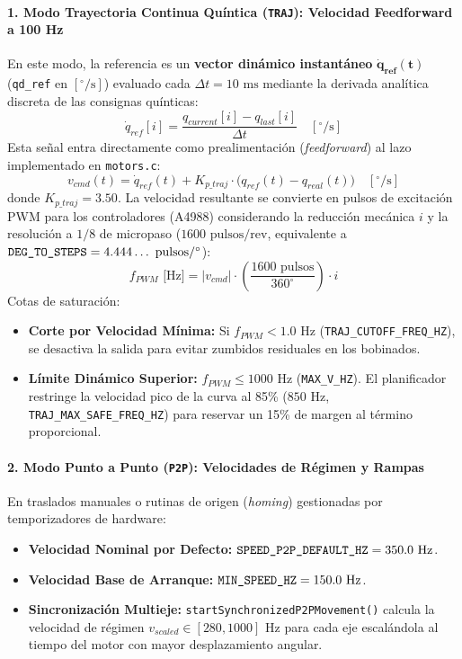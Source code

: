 \documentclass[12pt, a4paper]{report}
\begin{document}
\paragraph{1. Modo Trayectoria Continua Quíntica (\texttt{TRAJ}): Velocidad Feedforward a 100 Hz}
En este modo, la referencia es un \textbf{vector dinámico instantáneo} $\mathbf{\dot{q}_{ref}(t)}$ (\texttt{qd\_ref} en $[^\circ/\text{s}]$) evaluado cada $\Delta t = 10\text{ ms}$ mediante la derivada analítica discreta de las consignas quínticas:
\begin{equation}
    \dot{q}_{ref}[i] = \frac{q_{current}[i] - q_{last}[i]}{\Delta t} \quad [^\circ/\text{s}]
\end{equation}
Esta señal entra directamente como prealimentación (\textit{feedforward}) al lazo implementado en \texttt{motors.c}:
\begin{equation}
    v_{cmd}(t) = \dot{q}_{ref}(t) + K_{p\_traj} \cdot \big(q_{ref}(t) - q_{real}(t)\big) \quad [^\circ/\text{s}]
\end{equation}
donde $K_{p\_traj} = 3.50$. La velocidad resultante se convierte en pulsos de excitación PWM para los controladores (A4988) considerando la reducción mecánica $i$ y la resolución a $1/8$ de micropaso ($1600\text{ pulsos/rev}$, equivalente a $\text{\texttt{DEG\_TO\_STEPS}} = 4.444\dots\text{ pulsos}/^\circ$):
\begin{equation}
    f_{PWM}\text{ [Hz]} = |v_{cmd}| \cdot \left(\frac{1600\text{ pulsos}}{360^\circ}\right) \cdot i
\end{equation}
Cotas de saturación:
\begin{itemize}
    \item \textbf{Corte por Velocidad Mínima:} Si $f_{PWM} < 1.0\text{ Hz}$ (\texttt{TRAJ\_CUTOFF\_FREQ\_HZ}), se desactiva la salida para evitar zumbidos residuales en los bobinados.
    \item \textbf{Límite Dinámico Superior:} $f_{PWM} \le 1000\text{ Hz}$ (\texttt{MAX\_V\_HZ}). El planificador restringe la velocidad pico de la curva al 85\% ($850\text{ Hz}$, \texttt{TRAJ\_MAX\_SAFE\_FREQ\_HZ}) para reservar un 15\% de margen al término proporcional.
\end{itemize}

\paragraph{2. Modo Punto a Punto (\texttt{P2P}): Velocidades de Régimen y Rampas}
En traslados manuales o rutinas de origen (\textit{homing}) gestionadas por temporizadores de hardware:
\begin{itemize}
    \item \textbf{Velocidad Nominal por Defecto:} $\text{\texttt{SPEED\_P2P\_DEFAULT\_HZ}} = 350.0\text{ Hz}$.
    \item \textbf{Velocidad Base de Arranque:} $\text{\texttt{MIN\_SPEED\_HZ}} = 150.0\text{ Hz}$.
    \item \textbf{Sincronización Multieje:} \texttt{startSynchronizedP2PMovement()} calcula la velocidad de régimen $v_{scaled} \in [280, 1000]\text{ Hz}$ para cada eje escalándola al tiempo del motor con mayor desplazamiento angular.
\end{itemize}
\end{document}

